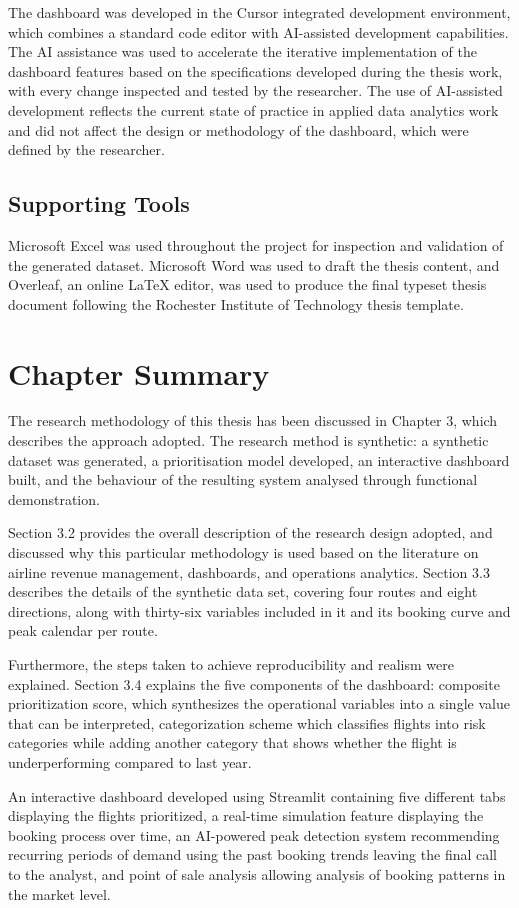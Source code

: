 The dashboard was developed in the Cursor integrated development environment, which combines a standard code editor with AI-assisted development capabilities. The AI assistance was used to accelerate the iterative implementation of the dashboard features based on the specifications developed during the thesis work, with every change inspected and tested by the researcher. The use of AI-assisted development reflects the current state of practice in applied data analytics work and did not affect the design or methodology of the dashboard, which were defined by the researcher.

\subsection{Supporting Tools}

Microsoft Excel was used throughout the project for inspection and validation of the generated dataset. Microsoft Word was used to draft the thesis content, and Overleaf, an online LaTeX editor, was used to produce the final typeset thesis document following the Rochester Institute of Technology thesis template.

\section{Chapter Summary}

The research methodology of this thesis has been discussed in Chapter 3, which describes the approach adopted. The research method is synthetic: a synthetic dataset was generated, a prioritisation model developed, an interactive dashboard built, and the behaviour of the resulting system analysed through functional demonstration.

Section 3.2 provides the overall description of the research design adopted, and discussed why this particular methodology is used based on the literature on airline revenue management, dashboards, and operations analytics. Section 3.3 describes the details of the synthetic data set, covering four routes and eight directions, along with thirty-six variables included in it and its booking curve and peak calendar per route.

Furthermore, the steps taken to achieve reproducibility and realism were explained. Section 3.4 explains the five components of the dashboard: composite prioritization score, which synthesizes the operational variables into a single value that can be interpreted, categorization scheme which classifies flights into risk categories while adding another category that shows whether the flight is underperforming compared to last year.

An interactive dashboard developed using Streamlit containing five different tabs displaying the flights prioritized, a real-time simulation feature displaying the booking process over time, an AI-powered peak detection system recommending recurring periods of demand using the past booking trends leaving the final call to the analyst, and point of sale analysis allowing analysis of booking patterns in the market level.